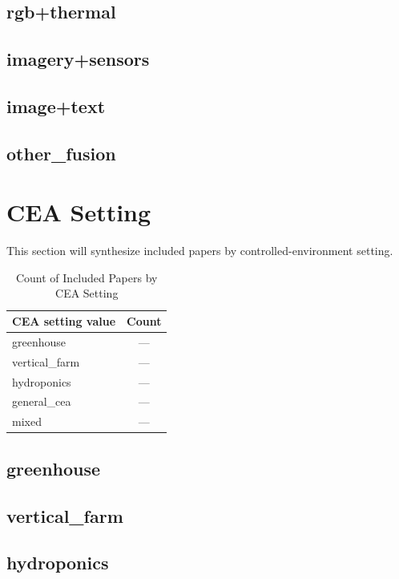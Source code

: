 \documentclass[lettersize,journal]{IEEEtran}
\begin{document}
\subsection{rgb+thermal}

\subsection{imagery+sensors}

\subsection{image+text}

\subsection{other\_fusion}


\section{CEA Setting}
This section will synthesize included papers by controlled-environment setting.

\begin{table}[H]
\caption{Count of Included Papers by CEA Setting}
\label{tab:cea_setting_counts}
\centering
\begin{tabular}{|l|c|}
\hline
CEA setting value & Count\\
\hline
greenhouse & ---\\
vertical\_farm & ---\\
hydroponics & ---\\
general\_cea & ---\\
mixed & ---\\
\hline
\end{tabular}
\end{table}

\subsection{greenhouse}

\subsection{vertical\_farm}

\subsection{hydroponics}
\end{document}
